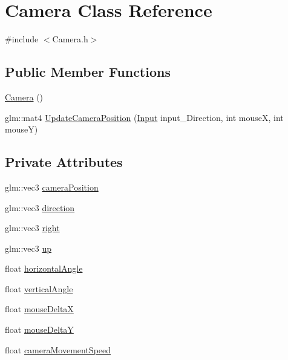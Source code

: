 \hypertarget{class_camera}{}\section{Camera Class Reference}
\label{class_camera}


{\ttfamily \#include $<$Camera.\+h$>$}

\subsection*{Public Member Functions}
\begin{DoxyCompactItemize}
\item 
\hyperlink{class_camera_a01f94c3543f56ede7af49dc778f19331}{Camera} ()
\item 
glm\+::mat4 \hyperlink{class_camera_ac0f7e4d6a41e3b425eed9cfa392a9508}{Update\+Camera\+Position} (\hyperlink{common_8h_a080a822f0093973313bd644e517a5090}{Input} input\+\_\+\+Direction, int mouse\+X, int mouse\+Y)
\end{DoxyCompactItemize}
\subsection*{Private Attributes}
\begin{DoxyCompactItemize}
\item 
glm\+::vec3 \hyperlink{class_camera_aca1334c1a10c3a1fe84a2979b205ff9a}{camera\+Position}
\item 
glm\+::vec3 \hyperlink{class_camera_aa91491698db51f70c62199d8c2213514}{direction}
\item 
glm\+::vec3 \hyperlink{class_camera_aebffcc6289dd99df7554b18d00a81161}{right}
\item 
glm\+::vec3 \hyperlink{class_camera_a3fe5f351380fb118ffc600591769f049}{up}
\item 
float \hyperlink{class_camera_aad9d573147be409e929251eca0bea339}{horizontal\+Angle}
\item 
float \hyperlink{class_camera_a6582a5068d81b8de7a7fc67e5143e628}{vertical\+Angle}
\item 
float \hyperlink{class_camera_a38f42e9b04d2180f267af1bdd5b87216}{mouse\+Delta\+X}
\item 
float \hyperlink{class_camera_a65944911597dcfb60e21300ed8c62305}{mouse\+Delta\+Y}
\item 
float \hyperlink{class_camera_a0ca21737f5a9fb6a9fda61e7e92c9a5e}{camera\+Movement\+Speed}
\end{DoxyCompactItemize}


